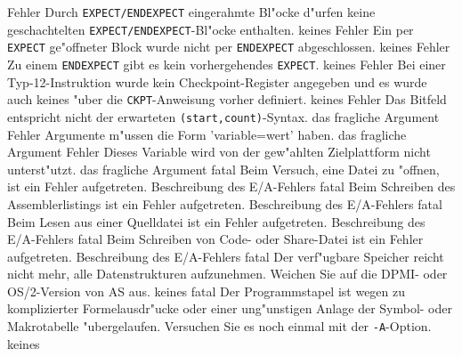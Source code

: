 \documentclass[12pt,a4paper,twoside]{report}
\newcommand{\tty}[1]{{\tt #1}}
\begin{document}
\begin{description}
               {Fehler}
               {Durch {\tt EXPECT/ENDEXPECT} eingerahmte Bl"ocke d"urfen keine
                geschachtelten {\tt EXPECT/ENDEXPECT}-Bl"ocke enthalten.}
               {keines}
               {Fehler}
               {Ein per {\tt EXPECT} ge"offneter Block wurde nicht per
                {\tt ENDEXPECT} abgeschlossen.}
               {keines}
               {Fehler}
               {Zu einem {\tt ENDEXPECT} gibt es kein vorhergehendes {\tt EXPECT}.}
               {keines}
               {Fehler}
               {Bei einer Typ-12-Instruktion wurde kein Checkpoint-Register angegeben
                und es wurde auch keines "uber die {\tt CKPT}-Anweisung vorher definiert.}
               {keines}
               {Fehler}
               {Das Bitfeld entspricht nicht der erwarteten {\tt (start,count)}-Syntax.}
               {das fragliche Argument}
               {Fehler}
               {Argumente m"ussen die Form 'variable=wert' haben.}
               {das fragliche Argument}
               {Fehler}
               {Dieses Variable wird von der gew"ahlten Zielplattform nicht unterst"utzt.}
               {das fragliche Argument}
               {fatal}
               {Beim Versuch, eine Datei zu "offnen, ist ein
                Fehler aufgetreten.}
               {Beschreibung des E/A-Fehlers}
               {fatal}
               {Beim Schreiben des Assemblerlistings ist ein
                Fehler aufgetreten.}
               {Beschreibung des E/A-Fehlers}
               {fatal}
               {Beim Lesen aus einer Quelldatei ist ein
                Fehler aufgetreten.}
               {Beschreibung des E/A-Fehlers}
               {fatal}
               {Beim Schreiben von Code- oder Share-Datei
                ist ein Fehler aufgetreten.}
               {Beschreibung des E/A-Fehlers}
               {fatal}
               {Der verf"ugbare Speicher reicht nicht mehr,
	        alle Datenstrukturen aufzunehmen.  Weichen Sie auf die
	        DPMI- oder OS/2-Version von AS aus.}
               {keines}
               {fatal}
               {Der Programmstapel ist wegen zu komplizierter
	        Formelausdr"ucke oder einer ung"unstigen Anlage der Symbol-
	        oder Makrotabelle "ubergelaufen.  Versuchen Sie es noch
	        einmal mit der \tty{-A}-Option.}
               {keines}
\end{description}
\end{document}

